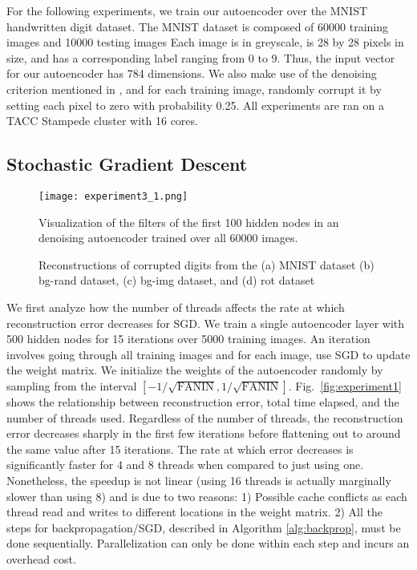 \FloatBarrier

For the following experiments, we train our autoencoder over the MNIST handwritten digit
dataset. The MNIST dataset is composed of 60000 training images and 10000
testing images Each image is in greyscale, is 28 by 28 pixels in size, and has
a corresponding label ranging from 0 to 9. Thus, the input vector for our
autoencoder has 784 dimensions. We also make use of the denoising criterion
mentioned in \cite{vincent2010stacked}, and for each training image, randomly
corrupt it by setting each pixel to zero with probability 0.25. All experiments are ran on a TACC Stampede cluster with 16 cores. 

\subsection{Stochastic Gradient Descent}

\begin{figure}[h] \centering
	\texttt{[image: experiment3\_1.png]}
	\caption{Visualization of the filters of the first 100 hidden nodes in an
	denoising autoencoder trained over all 60000 images.}
	\label{fig:experiment3_1}
\end{figure}

\begin{figure*}
  \centering
  \hspace{5mm}
  \caption{Reconstructions of corrupted digits from the (a) MNIST dataset (b) bg-rand dataset, (c) bg-img dataset, and (d) rot dataset}
  \label{fig:reconstruct}
\end{figure*}


We first analyze how the number of threads affects the rate at which reconstruction
error decreases for SGD. We train a single autoencoder layer with 500 hidden nodes for
15 iterations over 5000 training images. An iteration involves going through
all training images and for each image, use SGD to update the weight matrix. We initialize the weights of the autoencoder randomly by sampling from the interval $[-1/\sqrt{\text{FANIN}}, 1/\sqrt{\text{FANIN}}]$.
Fig.~\ref{fig:experiment1} shows the relationship between reconstruction error, total
time elapsed, and the number of threads used. Regardless of the number of
threads, the reconstruction error decreases sharply in the first few iterations
before flattening out to around the same value after 15 iterations. The rate at
which error decreases is significantly faster for 4 and 8 threads when
compared to just using one. Nonetheless, the speedup is not linear (using 16 threads is actually marginally slower than using 8) and is due
to two reasons: 1) Possible cache conflicts as each thread read and writes to
different locations in the weight matrix. 2) All the steps for
backpropagation/SGD, described in Algorithm \ref{alg:backprop}, must be done
sequentially. Parallelization can only be done within each step and incurs an
overhead cost.

